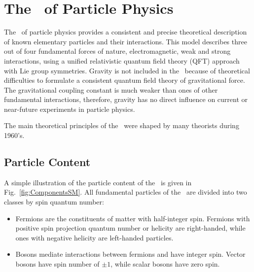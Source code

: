 \section{The \sm\ of Particle Physics}
\label{sec:SM}
The \sm\ of particle physics provides a consistent and precise theoretical description of known elementary particles and their interactions.
This model describes three out of four fundamental forces of nature, electromagnetic, weak and strong interactions, using a unified relativistic quantum field theory (QFT) approach with Lie group symmetries.
Gravity is not included in the \sm\ because of theoretical difficulties to formulate a consistent quantum field theory of gravitational force. 
The gravitational coupling constant is much weaker than ones of other fundamental interactions, therefore, gravity has no direct influence on current or near-future experiments in particle physics.

The main theoretical principles of the \sm\ were shaped by many theorists during 1960's. 



\subsection{Particle Content}
\label{sec:ParticleComposition_SM}
A simple illustration of the particle content of the \sm\  is given in Fig.~\ref{fig:ComponentsSM}.
All fundamental particles of the \sm\ are divided into two classes by spin quantum number: %

\begin{itemize}
\item Fermions are the constituents of matter with half-integer spin. Fermions with positive spin projection quantum number or helicity are right-handed, while ones with negative helicity are left-handed particles. 
\item Bosons mediate interactions between fermions and have integer spin. Vector bosons have spin number of $\pm 1$, while scalar bosons have zero spin. 
\end{itemize}

